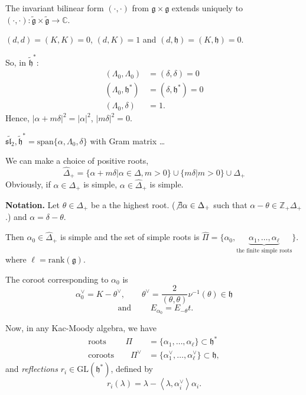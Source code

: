 \medskip\noindent
The invariant bilinear form $(\cdot,\cdot)$ from $\mathfrak{g} \times
\mathfrak{g}$ extends uniquely to
$(\cdot,\cdot):\tilde{\mathfrak{g}}\times\tilde{\mathfrak{g}}\to \mathbb{C}$.

$(d,d)=(K,K)=0$, $(d,K)=1$ and $(d,\mathfrak{h})=(K,\mathfrak{h})=0$.

\medskip\noindent
So, in $\tilde{\mathfrak{h}}^*$:
\begin{align*}
(\Lambda_0,\Lambda_0)&=(\delta,\delta)=0\\
(\Lambda_0,\mathfrak{h}^*)&=(\delta,\mathfrak{h}^*)=0\\
(\Lambda_0,\delta)&=1.
\end{align*}
Hence, $|\alpha+m \delta|^2=|\alpha|^2$, $|m \delta|^2=0$.

\begin{example}
\label{example-sl2hat}
$\widetilde{\mathfrak{sl}_2}, \tilde{\mathfrak{h}}^*
=\text{span}\{\alpha,\Lambda_0,\delta\}$ with Gram matrix …
\end{example}

We can make a choice of positive roots,
$$
\hat{\Delta}_+=\{\alpha+m \delta |\alpha \in \Delta, m>0\}
\cup \{m \delta|m>0\} \cup \Delta_+
$$
Obviously, if $\alpha \in \Delta_+$ is simple, 
$\alpha \in \hat{\Delta}_+$ is simple.

\medskip\noindent
{\bf Notation.} Let $\theta \in \Delta_+$ be a the highest root. ($\not \exists
\alpha \in \Delta_+$ such that $\alpha-\theta \in \mathbb{Z}_+ \Delta_+$.) and
 $\alpha=\delta-\theta$.

Then $\alpha_0 \in \hat{\Delta}_+$ is simple and the set of simple roots is
$\hat{\Pi}=\{\alpha_0,\underbrace{\alpha_1,\ldots,\alpha_\ell}_{\text{
the finite simple roots}}\}.$
where $\ell=\text{rank}(\mathfrak{g})$.

The coroot corresponding to $\alpha_0$ is 
$$
\alpha^\vee_0=K-\theta^\vee, \qquad
\theta^\vee=\frac{2}{(\theta,\theta)}\nu^{-1}(\theta) \in \mathfrak{h} 
$$
$$
\text{ and }\qquad E_{\alpha_0}=E_{-\theta}t.
$$

\medskip\noindent
Now, in any Kac-Moody algebra, we have
\begin{align*}
\text{roots }\qquad \Pi&=\{\alpha_1,\ldots,\alpha_\ell\}\subset\mathfrak{h}^* \\
\text{coroots}\qquad  \Pi^\vee&=\{\alpha_1^\vee,\ldots,\alpha_\ell^\vee\}\subset
\mathfrak{h},
\end{align*}
and {\it reflections} $r_i \in \text{GL}(\mathfrak{h}^*)$,
defined by 
$$
r_i(\lambda)=\lambda-\left<\lambda,\alpha_i^\vee\right>\alpha_i.
$$

